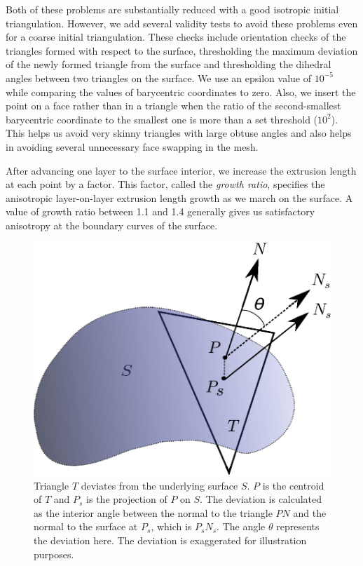 Both of these problems are substantially reduced with a good isotropic initial triangulation. However, we add several validity tests to avoid these problems even for a coarse initial triangulation. These checks include orientation checks of the triangles formed with respect to the surface, thresholding the maximum deviation of the newly formed triangle from the surface and thresholding the dihedral angles between two triangles on the surface. We use an epsilon value of $10^{-5}$ while comparing the values of barycentric coordinates to zero. Also, we insert the point on a face rather than in a triangle when the ratio of the second-smallest barycentric coordinate to the smallest one is more than a set threshold ($10^2$). This helps us avoid very skinny triangles with large obtuse angles and also helps in avoiding several unnecessary face swapping in the mesh.

After advancing one layer to the surface interior, we increase the extrusion length at each point by a factor. This factor, called the \textit{growth ratio}, specifies the anisotropic layer-on-layer extrusion length growth as we march on the surface. A value of growth ratio between 1.1 and 1.4 generally gives us satisfactory anisotropy at the boundary curves of the surface.


\begin{figure}[!hbt]
    \centering
    \includegraphics[width=.5\textwidth]{img/m1/deviate-surface.eps}
    \caption{Triangle $T$ deviates from the underlying surface $S$. $P$ is the centroid of $T$ and $P_s$ is the projection of $P$ on $S$. The deviation is calculated as the interior angle between the normal to the triangle $PN$ and the normal to the surface at $P_s$, which is $P_sN_s$. The angle $\theta$ represents the deviation here. The deviation is exaggerated for illustration purposes.}
    \label{deviation-surface}
\end{figure}

